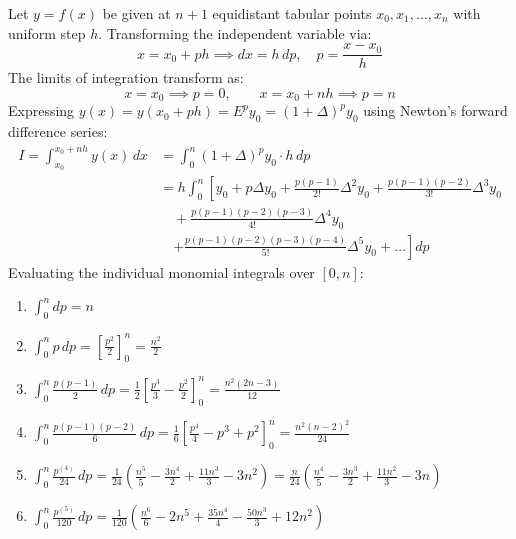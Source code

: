 \begin{theorembox}
Let $y = f(x)$ be given at $n+1$ equidistant tabular points $x_0, x_1, \dots, x_n$ with uniform step $h$.
Transforming the independent variable via:
\begin{equation}
    x = x_0 + p h \implies dx = h \, dp, \quad p = \frac{x - x_0}{h}
\end{equation}
The limits of integration transform as:
\begin{equation}
    x = x_0 \implies p = 0, \qquad x = x_0 + n h \implies p = n
\end{equation}
Expressing $y(x) = y(x_0 + p h) = E^p y_0 = (1 + \Delta)^p y_0$ using Newton's forward difference series:
\begin{align}
    I = \int_{x_0}^{x_0 + n h} y(x) \, dx &= \int_{0}^{n} (1 + \Delta)^p y_0 \cdot h \, dp \nonumber \\
    &= h \int_{0}^{n} \left[ y_0 + p \Delta y_0 + \frac{p(p-1)}{2!} \Delta^2 y_0 + \frac{p(p-1)(p-2)}{3!} \Delta^3 y_0 \right. \nonumber \\
    &\quad + \frac{p(p-1)(p-2)(p-3)}{4!} \Delta^4 y_0 \nonumber \\
    &\quad \left. + \frac{p(p-1)(p-2)(p-3)(p-4)}{5!} \Delta^5 y_0 + \dots \right] dp
\end{align}
Evaluating the individual monomial integrals over $[0, n]$:
\begin{enumerate}[label=(\roman*),noitemsep]
    \item $\displaystyle \int_{0}^{n} dp = n$
    \item $\displaystyle \int_{0}^{n} p \, dp = \left[ \frac{p^2}{2} \right]_0^n = \frac{n^2}{2}$
    \item $\displaystyle \int_{0}^{n} \frac{p(p-1)}{2} \, dp = \frac{1}{2} \left[ \frac{p^3}{3} - \frac{p^2}{2} \right]_0^n = \frac{n^2(2n - 3)}{12}$
    \item $\displaystyle \int_{0}^{n} \frac{p(p-1)(p-2)}{6} \, dp = \frac{1}{6} \left[ \frac{p^4}{4} - p^3 + p^2 \right]_0^n = \frac{n^2(n-2)^2}{24}$
    \item $\displaystyle \int_{0}^{n} \frac{p^{(4)}}{24} \, dp = \frac{1}{24} \left( \frac{n^5}{5} - \frac{3n^4}{2} + \frac{11n^3}{3} - 3n^2 \right) = \frac{n}{24}\left(\frac{n^4}{5} - \frac{3n^3}{2} + \frac{11n^2}{3} - 3n\right)$
    \item $\displaystyle \int_{0}^{n} \frac{p^{(5)}}{120} \, dp = \frac{1}{120} \left( \frac{n^6}{6} - 2n^5 + \frac{35n^4}{4} - \frac{50n^3}{3} + 12n^2 \right)$
\end{enumerate}

\end{theorembox}

